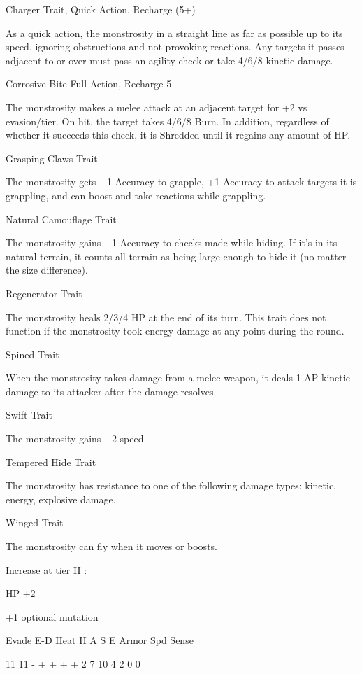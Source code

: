 Charger
Trait, Quick Action, Recharge (5+)

As a quick action, the monstrosity in a straight line as far as possible up to its speed, ignoring
obstructions and not provoking reactions. Any targets it passes adjacent to or over must pass an
agility check or take 4/6/8 kinetic damage.


Corrosive Bite
Full Action, Recharge 5+

The monstrosity makes a melee attack at an adjacent target for +2 vs evasion/tier. On hit, the
target takes 4/6/8 Burn. In addition, regardless of whether it succeeds this check, it is Shredded
until it regains any amount of HP.


Grasping Claws
Trait

The monstrosity gets +1 Accuracy to grapple, +1 Accuracy to attack targets it is grappling, and
can boost and take reactions while grappling.


Natural Camouflage
Trait

The monstrosity gains +1 Accuracy to checks made while hiding. If it’s in its natural terrain, it
counts all terrain as being large enough to hide it (no matter the size difference).


Regenerator
Trait

The monstrosity heals 2/3/4 HP at the end of its turn. This trait does not function if the
monstrosity took energy damage at any point during the round.


Spined
Trait

When the monstrosity takes damage from a melee weapon, it deals 1 AP kinetic damage to its
attacker after the damage resolves.


Swift
Trait

The monstrosity gains +2 speed


Tempered Hide
Trait

The monstrosity has resistance to one of the following damage types: kinetic, energy, explosive
damage.





Winged
Trait

The monstrosity can fly when it moves or boosts.


Increase at tier II :

HP +2

+1 optional mutation


         Evade    E-D     Heat    H   A   S    E   Armor     Spd       Sense

         11       11      -       +   +   +    +   2         7         10
                                  4   2   0    0

